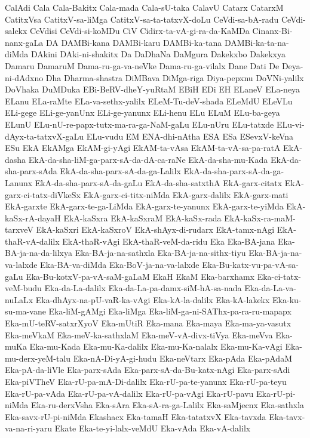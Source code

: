 {CalAdi
Cala
Cala-Bakitx
Cala-mada
Cala-sU-taka
CalavU
Catarx
CatarxM
CatitxVsa
CatitxV-sa-liMga
CatitxV-sa-ta-tatxvX-doLu
CeVdi-sa-bA-radu
CeVdi-salekx
CeVdisi
CeVdi-si-koMDu
CiV
Cidirx-ta-vA-gi-ra-da-KaMDa
Cinanx-Bi-nanx-gaLa
DA
DAMBi-kana
DAMBi-karu
DAMBi-ka-tana
DAMBi-ka-ta-na-diMda
DAkini
DAki-ni-shakitx
Da
DaDhaNa
DaMgura
Dakekxbo
Dakekxya
Damaru
DamaruM
Dama-ru-ga-va-neVke
Dama-ru-ga-vilalx
Dane
Dati
De
Deya-ni-dAdxno
Dha
Dharma-shastra
DiMBava
DiMga-riga
Diya-pepxnu
DoVNi-yalilx
DoVhaka
DuMDuka
EBi-BeRV-dheY-yuRtaM
EBiH
EDi
EH
ELaneV
ELa-neya
ELanu
ELa-raMte
ELa-va-sethx-yalilx
ELeM-Tu-deV-shada
ELeMdU
ELeVLu
ELi-gege
ELi-ge-yanUnx
ELi-ge-yanunx
ELi-henu
ELu
ELuM
ELu-ba-geya
ELunU
ELu-nU-re-papx-tutx-ma-ra-ga-NaM-gaLu
ELu-nUru
ELu-tatxde
ELu-vi-dAyx-ta-tatxvX-gaLu
ELu-vudu
EM
ENA-dhi-nAtha
ESA
ESa
ESevxV-keVna
ESu
EkA
EkAMga
EkAM-gi-yAgi
EkAM-ta-vAsa
EkAM-ta-vA-sa-pa-ratA
EkA-dasha
EkA-da-sha-liM-ga-parx-sA-da-dA-ca-raNe
EkA-da-sha-mu-Kada
EkA-da-sha-parx-sAda
EkA-da-sha-parx-sA-da-ga-Lalilx
EkA-da-sha-parx-sA-da-ga-Lanunx
EkA-da-sha-parx-sA-da-gaLu
EkA-da-sha-satxthA
EkA-garx-citatx
EkA-garx-ci-tatx-diVkeSx
EkA-garx-ci-titx-niMda
EkA-garx-dalilx
EkA-garx-mati
EkA-garxte
EkA-garx-te-ga-LiMda
EkA-garx-te-yanunx
EkA-garx-te-yiMda
EkA-kaSx-rA-dayaH
EkA-kaSxra
EkA-kaSxraM
EkA-kaSx-rada
EkA-kaSx-ra-maM-tarxveV
EkA-kaSxri
EkA-kaSxroV
EkA-shAyx-di-rudarx
EkA-tamx-nAgi
EkA-thaR-vA-dalilx
EkA-thaR-vAgi
EkA-thaR-veM-da-ridu
Eka
Eka-BA-jana
Eka-BA-ja-na-da-lilxya
Eka-BA-ja-na-sathxla
Eka-BA-ja-na-sithx-tiyu
Eka-BA-ja-na-va-lalxde
Eka-BA-va-diMda
Eka-BoV-ja-na-va-lalxde
Eka-Bu-katx-vu-pa-vA-sa-gaLu
Eka-Bu-kotxV-pa-vA-saM-gaLaM
EkaH
EkaM
Eka-barxhamx
Eka-ci-tatx-veM-budu
Eka-da-La-dalilx
Eka-da-La-pa-damx-siM-hA-sa-nada
Eka-da-La-va-nuLaLx
Eka-dhAyx-na-pU-vaR-ka-vAgi
Eka-kA-la-dalilx
Eka-kA-lakekx
Eka-ku-su-ma-vane
Eka-liM-gAMgi
Eka-liMga
Eka-liM-ga-ni-SAThx-pa-ra-ru-mapapx
Eka-mU-teRV-satxrXyoV
Eka-mUtiR
Eka-mana
Eka-maya
Eka-ma-ya-vasutx
Eka-meVkaM
Eka-meV-ka-sathxlaM
Eka-meV-vA-divx-tiVya
Eka-meVva
Eka-muKa
Eka-mu-Kada
Eka-mu-Ka-dalilx
Eka-mu-Ka-nalalx
Eka-mu-Ka-vAgi
Eka-mu-derx-yeM-talu
Eka-nA-Di-yA-gi-hudu
Eka-neVtarx
Eka-pAda
Eka-pAdaM
Eka-pA-da-liVle
Eka-parx-sAda
Eka-parx-sA-da-Bu-katx-nAgi
Eka-parx-sAdi
Eka-piVTheV
Eka-rU-pa-mA-Di-dalilx
Eka-rU-pa-te-yanunx
Eka-rU-pa-teyu
Eka-rU-pa-vAda
Eka-rU-pa-vA-dalilx
Eka-rU-pa-vAgi
Eka-rU-pavu
Eka-rU-pi-niMda
Eka-ru-derxVsha
Eka-sAra
Eka-sA-ra-ga-Lalilx
Eka-saMjecnx
Eka-sathxla
Eka-savx-rU-pi-niMda
Ekashacx
Eka-tamaH
Eka-tatatxvX
Eka-tavxda
Eka-tavx-va-na-ri-yaru
Ekate
Eka-te-yi-lalx-veMdU
Eka-vAda
Eka-vA-dalilx
}
